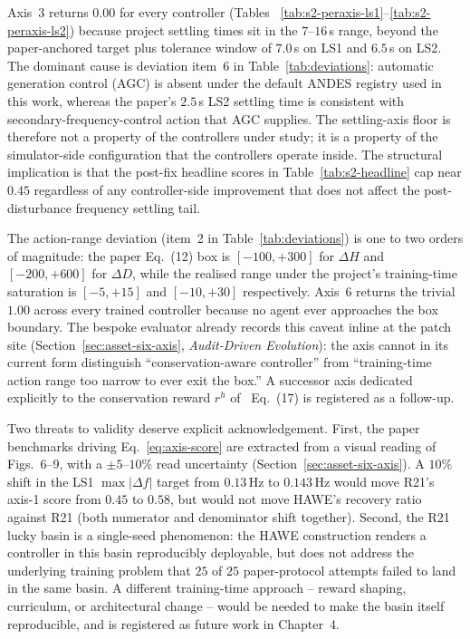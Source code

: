 \documentclass{unnc-fyp}
\begin{document}
Axis~3 returns $0.00$ for every controller (Tables~%
\ref{tab:s2-peraxis-ls1}--\ref{tab:s2-peraxis-ls2}) because
project settling times sit in the $7$--$16$\,s range, beyond the
paper-anchored target plus tolerance window of $7.0$\,s on LS1
and $6.5$\,s on LS2.
The dominant cause is deviation item~6 in
Table~\ref{tab:deviations}: automatic generation control (AGC)
is absent under the default ANDES registry used in this work,
whereas the paper's $2.5$\,s LS2 settling time is consistent with
secondary-frequency-control action that AGC supplies.
The settling-axis floor is therefore not a property of the
controllers under study; it is a property of the simulator-side
configuration that the controllers operate inside.
The structural implication is that the post-fix headline scores
in Table~\ref{tab:s2-headline} cap near $0.45$ regardless of any
controller-side improvement that does not affect the
post-disturbance frequency settling tail.

The action-range deviation (item~2 in
Table~\ref{tab:deviations}) is one to two orders of magnitude:
the paper Eq.~(12) box is $[-100, +300]$ for $\Delta H$ and
$[-200, +600]$ for $\Delta D$, while the realised range under the
project's training-time saturation is $[-5, +15]$ and
$[-10, +30]$ respectively.
Axis~6 returns the trivial $1.00$ across every trained controller
because no agent ever approaches the box boundary.
The bespoke evaluator already records this caveat inline at the
patch site (Section~\ref{sec:asset-six-axis},
\emph{Audit-Driven Evolution}): the axis cannot in its current
form distinguish ``conservation-aware controller'' from
``training-time action range too narrow to ever exit the box.''
A successor axis dedicated explicitly to the conservation reward
$r^h$ of~\cite{yang2023ddic} Eq.~(17) is registered as a
follow-up.

Two threats to validity deserve explicit acknowledgement.
First, the paper benchmarks driving Eq.~\eqref{eq:axis-score} are
extracted from a visual reading of~\cite{yang2023ddic}
Figs.~6--9, with a $\pm 5$--$10\%$ read uncertainty
(Section~\ref{sec:asset-six-axis}).
A $10\%$ shift in the LS1 $\max|\Delta f|$ target from $0.13$\,Hz
to $0.143$\,Hz would move R21's axis-1 score from $0.45$ to
$0.58$, but would not move HAWE's recovery ratio against R21
(both numerator and denominator shift together).
Second, the R21 lucky basin is a single-seed phenomenon: the HAWE
construction renders a controller in this basin reproducibly
deployable, but does not address the underlying training
problem that $25$ of $25$ paper-protocol attempts failed to land
in the same basin.
A different training-time approach -- reward shaping, curriculum,
or architectural change -- would be needed to make the basin
itself reproducible, and is registered as future work in
Chapter~4.
\end{document}
